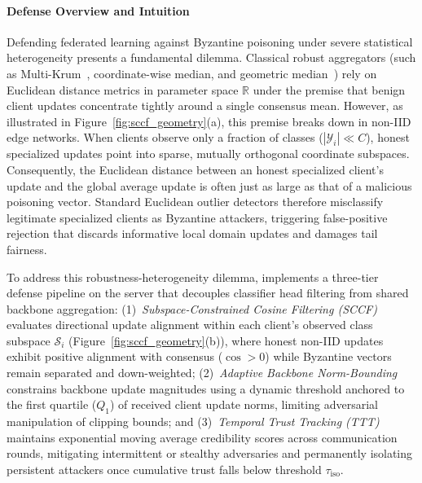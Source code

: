 \paragraph{Defense Overview and Intuition}
Defending federated learning against Byzantine poisoning under severe statistical heterogeneity presents a fundamental dilemma. Classical robust aggregators (such as Multi-Krum~\cite{blanchard2017machine}, coordinate-wise median, and geometric median~\cite{yin2018byzantine}) rely on Euclidean distance metrics in parameter space $\mathbb{R}$ under the premise that benign client updates concentrate tightly around a single consensus mean. However, as illustrated in Figure~\ref{fig:sccf_geometry}(a), this premise breaks down in non-IID edge networks. When clients observe only a fraction of classes ($|\mathcal{Y}_i| \ll C$), honest specialized updates point into sparse, mutually orthogonal coordinate subspaces. Consequently, the Euclidean distance between an honest specialized client's update and the global average update is often just as large as that of a malicious poisoning vector. Standard Euclidean outlier detectors therefore misclassify legitimate specialized clients as Byzantine attackers, triggering false-positive rejection that discards informative local domain updates and damages tail fairness.

To address this robustness-heterogeneity dilemma, \fedhep{} implements a three-tier defense pipeline on the server that decouples classifier head filtering from shared backbone aggregation: (1)~\textit{Subspace-Constrained Cosine Filtering (SCCF)} evaluates directional update alignment within each client's observed class subspace $\mathcal{S}_i$ (Figure~\ref{fig:sccf_geometry}(b)), where honest non-IID updates exhibit positive alignment with consensus ($\cos > 0$) while Byzantine vectors remain separated and down-weighted; (2)~\textit{Adaptive Backbone Norm-Bounding} constrains backbone update magnitudes using a dynamic threshold anchored to the first quartile ($Q_1$) of received client update norms, limiting adversarial manipulation of clipping bounds; and (3)~\textit{Temporal Trust Tracking (TTT)} maintains exponential moving average credibility scores across communication rounds, mitigating intermittent or stealthy adversaries and permanently isolating persistent attackers once cumulative trust falls below threshold $\tau_{\mathrm{iso}}$.



